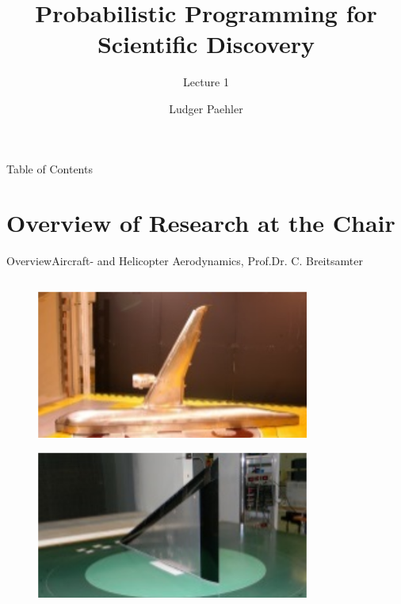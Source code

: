 \documentclass[AERbeamer%
              ,optEnglish%
              ,optBiber%
              ,optBibstyleAlphabetic%
              ,optBeamerClassicFormat%
              ]{AERlatex}%
\title{Probabilistic Programming for Scientific Discovery}%
\subtitle{Lecture 1}
\author{Ludger Paehler}%
\date{\AERutilsDate{29}{7}{2020}}%
\institute{Lviv Data Science Summer School}%
\begin{document}
%
%
\AERbeamerTitlePageDefault%
%
%

\begin{frame}{Table of Contents}{}%
    \tableofcontents
\end{frame}%


\section{Overview of Research at the Chair}


\begin{frame}[c]{Overview}{Aircraft- and Helicopter Aerodynamics, Prof.Dr. C. Breitsamter}
    \centering
    \begin{columns}[T]
        \begin{column}{0.33\textwidth}
            \begin{figure}
                \centering
                \includegraphics[width=0.8\textwidth]{Breitsamter1.png}
            \end{figure}
            \begin{figure}
                \centering
                \includegraphics[width=0.8\textwidth]{Breitsamter2.png}

\end{figure}
\end{column}
\end{columns}
\end{frame}
\end{document}

